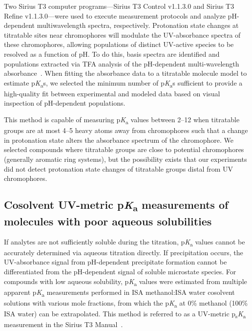 \documentclass[9pt,lineno]{elife}
\newcommand{\pKa}{p\textit{K}\textsubscript{a}}
\newcommand{\psKa}{p\textsubscript{s}\textit{K}\textsubscript{a}}
\begin{document}
Two Sirius T3 computer programs---Sirius T3 Control v1.1.3.0 and Sirius T3 Refine v1.1.3.0---were used to execute measurement protocols and analyze pH-dependent multiwavelength spectra, respectively.
Protonation state changes at titratable sites near chromophores will modulate the UV-absorbance spectra of these chromophores, allowing populations of distinct UV-active species to be resolved as a function of pH. 
To do this, basis spectra are identified and populations extracted via TFA analysis of the pH-dependent multi-wavelength absorbance~\citep{allen_multiwavelength_1998}. 
When fitting the absorbance data to a titratable molecule model to estimate \pKa{}s, we selected the minimum number of \pKa{}s sufficient to provide a high-quality fit between experimental and modeled data based on visual inspection of pH-dependent populations.

This method is capable of measuring \pKa{} values between 2--12 when titratable groups are at most 4--5 heavy atoms away from chromophores such that a change in protonation state alters the absorbance spectrum of the chromophore. 
We selected compounds where titratable groups are close to potential chromophores (generally aromatic ring systems), but the possibility exists that our experiments did not detect protonation state changes of titratable groups distal from UV chromophores.

\subsection{Cosolvent UV-metric \pKa{} measurements of molecules with poor aqueous solubilities}

If analytes are not sufficiently soluble during the titration, \pKa{} values cannot be accurately determined via aqueous titration directly. 
If precipitation occurs, the UV-absorbance signal from pH-dependent precipitate formation cannot be differentiated from the pH-dependent signal of soluble microstate species. 
For compounds with low aqueous solubility, \pKa{} values were estimated from multiple apparent \pKa{} measurements performed in ISA methanol:ISA water cosolvent solutions with various mole fractions, from which the \pKa{} at 0\% methanol (100\% ISA water) can be extrapolated. 
This method is referred to as a UV-metric \psKa{} measurement in the Sirius T3 Manual~\citep{noauthor_sirius_2008}.
\end{document}
